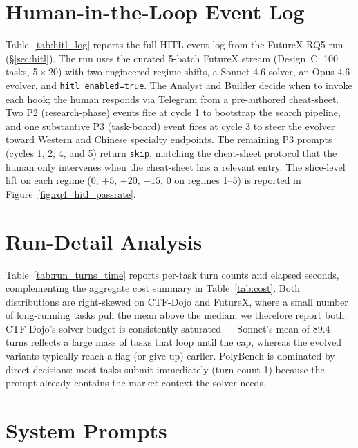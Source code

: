 \section{Human-in-the-Loop Event Log}
\label{app:hitl_log}

Table~\ref{tab:hitl_log} reports the full HITL event log from the FutureX RQ5 run (\S\ref{sec:hitl}). The run uses the curated 5-batch FutureX stream (Design~C: 100 tasks, 5\,$\times$\,20) with two engineered regime shifts, a Sonnet 4.6 solver, an Opus 4.6 evolver, and \texttt{hitl\_enabled=true}. The Analyst and Builder decide when to invoke each hook; the human responds via Telegram from a pre-authored cheat-sheet. Two P2 (research-phase) events fire at cycle 1 to bootstrap the search pipeline, and one substantive P3 (task-board) event fires at cycle 3 to steer the evolver toward Western and Chinese specialty endpoints. The remaining P3 prompts (cycles 1, 2, 4, and 5) return \texttt{skip}, matching the cheat-sheet protocol that the human only intervenes when the cheat-sheet has a relevant entry. The slice-level lift on each regime ($0$, $+5$, $+20$, $+15$, $0$ on regimes 1–5) is reported in Figure~\ref{fig:rq4_hitl_passrate}.



\section{Run-Detail Analysis}
\label{app:run_details}

Table~\ref{tab:run_turns_time} reports per-task turn counts and elapsed seconds, complementing the aggregate cost summary in Table~\ref{tab:cost}. Both distributions are right-skewed on CTF-Dojo and FutureX, where a small number of long-running tasks pull the mean above the median; we therefore report both. CTF-Dojo's solver budget is consistently saturated --- Sonnet's mean of 89.4 turns reflects a large mass of tasks that loop until the cap, whereas the evolved variants typically reach a flag (or give up) earlier. PolyBench is dominated by direct decisions: most tasks submit immediately (turn count 1) because the prompt already contains the market context the solver needs.



\clearpage
\onecolumn
\section{System Prompts}
\label{app:prompts}

